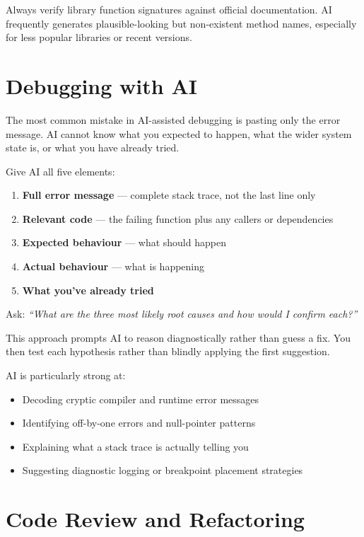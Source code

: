 \begin{warnbox}
Always verify library function signatures against official documentation.
AI frequently generates plausible-looking but non-existent method names, especially for
less popular libraries or recent versions.
\end{warnbox}

\section{Debugging with AI}
\label{sec:debugging}

The most common mistake in AI-assisted debugging is pasting only the error message.
AI cannot know what you expected to happen, what the wider system state is, or what
you have already tried.

\begin{infobox}
Give AI all five elements:
\begin{enumerate}
  \item \textbf{Full error message} --- complete stack trace, not the last line only
  \item \textbf{Relevant code} --- the failing function plus any callers or dependencies
  \item \textbf{Expected behaviour} --- what should happen
  \item \textbf{Actual behaviour} --- what is happening
  \item \textbf{What you've already tried}
\end{enumerate}
Ask: \textit{``What are the three most likely root causes and how would I confirm each?''}
\end{infobox}

This approach prompts AI to reason diagnostically rather than guess a fix.
You then test each hypothesis rather than blindly applying the first suggestion.

AI is particularly strong at:
\begin{itemize}
  \item Decoding cryptic compiler and runtime error messages
  \item Identifying off-by-one errors and null-pointer patterns
  \item Explaining what a stack trace is actually telling you
  \item Suggesting diagnostic logging or breakpoint placement strategies
\end{itemize}

\section{Code Review and Refactoring}
\label{sec:review}

